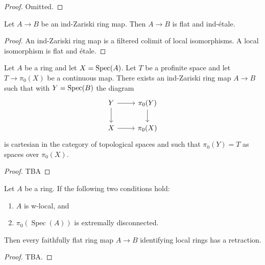 \begin{proof}
  Omitted.
\end{proof}

\begin{lemma}
  Let $A \to B$ be an ind-Zariski ring map. Then $A \to B$ is flat and ind-étale.
  \label{thm:ind-Zariski-is-flat-ind-etale}
\end{lemma}

\begin{proof}
  An ind-Zariski ring map is a filtered colimit of local isomorphisms. A local isomorphism is flat and étale.
\end{proof}

\begin{lemma}
Let $A$ be a ring and let $X = \operatorname{Spec} (A)$. Let $T$ be a profinite space and let $T \to \pi_0(X)$ be a continuous map. There exists an ind-Zariski ring map $A \to B$ such that with $Y = \operatorname{Spec} (B)$ the diagram
\[
\begin{tikzcd}
Y \arrow[r] \arrow[d] & \pi_0(Y) \arrow[d] \\
X \arrow[r] & \pi_0(X)
\end{tikzcd}
\]
is cartesian in the category of topological spaces and such that $\pi_0(Y) = T$ as spaces over $\pi_0(X)$.
\label{thm:exists-ind-Zariski-cartesian}
\end{lemma}

\begin{proof}
  TBA
\end{proof}

\begin{proposition}
  \label{thm:ff-identifies-local-rings-has-retraction-if}
  Let $A$ be a ring. If the following two conditions hold:
  \begin{enumerate}
    \item $A$ is w-local, and
    \item $\pi_0(\operatorname{Spec}(A))$ is extremally disconnected.
  \end{enumerate}
  Then every faithfully flat ring map $A \to B$ identifying local rings has a retraction.
\end{proposition}

\begin{proof}
  TBA.
\end{proof}

